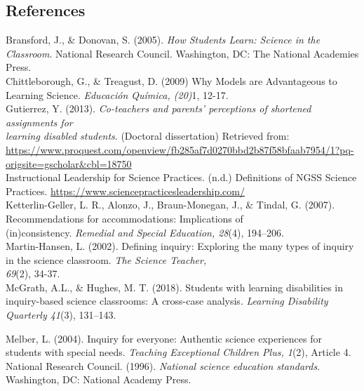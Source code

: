 \documentclass[11pt]{sig-alternate}
\begin{document}
\begin{large}
 
\section*{References}\par 

\leftskip 0.25in
\parindent -0.25in 

Bransford, J., \& Donovan, S. (2005). \textit{How Students Learn: Science in the Classroom}. National Research Council. Washington, DC: The National Academies Press.\\

Chittleborough, G., \& Treagust, D. (2009) Why Models are Advantageous to Learning Science.
\textit{Educación Química, (20)}1, 12-17.\\

Gutierrez, Y. (2013). \textit{Co-teachers and parents’ perceptions of shortened assignments for \\learning disabled students}. (Doctoral dissertation) Retrieved from: \url{https://www.proquest.com/openview/fb285af7d0270bbd2b87f58bfaab7954/1?pq-origsite=gscholar\&cbl=18750}\\

Instructional Leadership for Science Practices. (n.d.) Definitions of NGSS Science Practices. \url{https://www.sciencepracticesleadership.com/}\\

Ketterlin-Geller, L. R., Alonzo, J., Braun-Monegan, J., \& Tindal, G. (2007). Recommendations for accommodations: Implications of \\(in)consistency. \textit{Remedial and Special Education, 28}(4), 194–206.\\

Martin-Hansen, L. (2002). Defining inquiry: Exploring the many types of inquiry in the science classroom. \textit{The Science Teacher, \\69}(2), 34-37. \\

McGrath, A.L., \& Hughes, M. T. (2018). Students with learning disabilities in inquiry-based science classrooms: A cross-case analysis. \textit{Learning Disability Quarterly 41}(3), 131–143.

Melber, L. (2004). Inquiry for everyone: Authentic science experiences for students with special needs. \textit{Teaching Exceptional Children Plus, 1}(2), Article 4.\\

National Research Council. (1996). \textit{National science education standards}. Washington, DC: National Academy Press.\\


\end{large}
\end{document}
